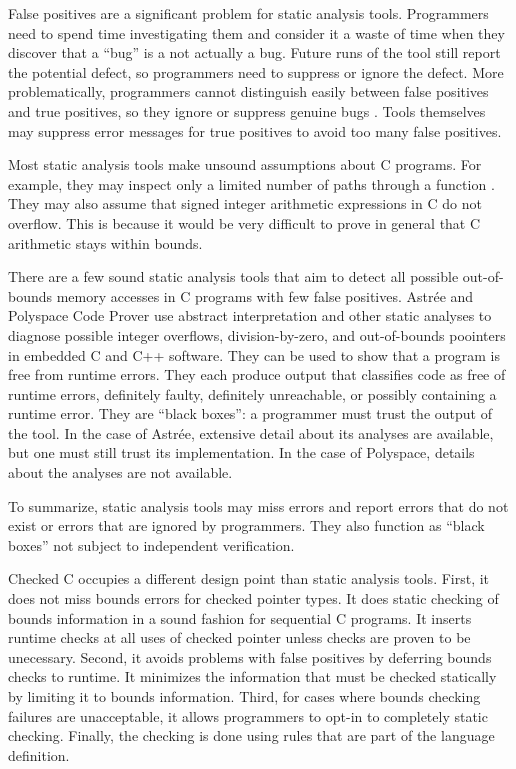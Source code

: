 False positives are a significant problem for static analysis tools. Programmers need
to spend time investigating them and consider it a waste of time when they discover
that a ``bug'' is a not actually a bug.   Future runs of the tool still report
the potential defect, so programmers need to suppress or ignore the defect.
More problematically, programmers cannot distinguish easily between false positives
and true positives, so they  ignore or suppress genuine bugs \cite{Bessey2010}.
Tools themselves may suppress error messages for true positives to avoid
too many false positives.

Most static analysis tools make unsound assumptions about C programs.
For example, they may inspect only a limited number of paths through
a function \cite{Bush2000}.  They may also assume that signed integer arithmetic
expressions in C do not overflow.  This is because it would be very difficult to
prove in general that C arithmetic stays within bounds.

There are a few sound static analysis tools that aim to detect all
possible out-of-bounds memory accesses in C programs with few false positives.
Astr\'{e}e \cite{Astree2016,Blanchet2003,Delmas2007}
and Polyspace Code Prover \cite{Polyspace2016} use 
abstract interpretation and other static analyses to diagnose possible integer
overflows, division-by-zero, and out-of-bounds
poointers in embedded C and C++ software.  They can be used to show that a program is 
free from runtime errors. They each produce output that classifies code as free of
runtime errors, definitely faulty, definitely unreachable, or possibly containing a runtime error.  They are ``black boxes'': a programmer must trust the output of the
tool.  In the case of Astr\'{e}e,  extensive detail about its analyses are available,
but one must still trust its implementation.  In the case of Polyspace, details
about the analyses are not available.

To summarize, static analysis tools may miss errors and report errors that do not exist
or errors that are ignored by programmers.  They also function as ``black
boxes'' not subject to independent verification.

Checked C occupies a different design point than static analysis tools.
First, it does not miss bounds errors for checked pointer types. 
It does static checking of bounds information in a sound fashion for sequential
C programs.  It inserts runtime checks at all uses of checked pointer unless
checks are proven to be unecessary.  Second, it avoids problems with false positives
by deferring bounds checks to runtime.  It minimizes the information that
must be checked statically by limiting it to bounds information.
Third, for cases where bounds checking failures are unacceptable, it allows
programmers to opt-in to completely static checking.  Finally, the checking is
done using rules that are part of the language definition.

